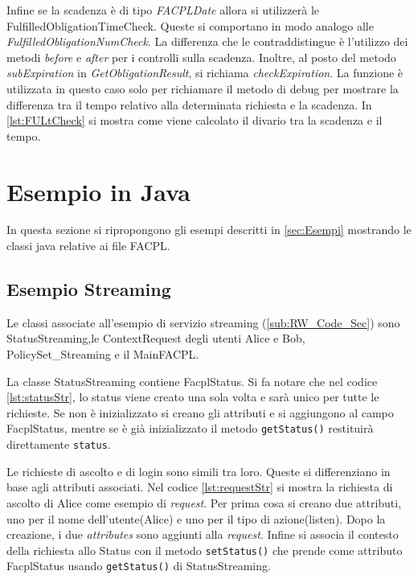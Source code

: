 Infine se la scadenza è di tipo \emph{FACPLDate} allora si utilizzerà le FulfilledObligationTimeCheck.
Queste si comportano in modo analogo alle \emph{FulfilledObligationNumCheck}. La differenza che le contraddistingue è
l'utilizzo dei metodi \emph{before} e \emph{after} per i controlli sulla scadenza.
Inoltre, al posto del metodo \emph{subExpiration} in \emph{GetObligationResult}, si richiama \emph{checkExpiration}.
La funzione è utilizzata in questo caso solo per richiamare il metodo di debug per mostrare
la differenza tra il tempo relativo alla determinata richiesta e la scadenza. In \ref{lst:FULtCheck} si
mostra come viene calcolato il divario tra la scadenza e il tempo.

\section{Esempio in Java}
\label{sec:Esempi in Java}
In questa sezione si ripropongono gli esempi descritti in \ref{sec:Esempi} mostrando le classi java relative
ai file FACPL.
\subsection{Esempio Streaming}
\label{sub:EsStreamingJava}
Le classi associate all'esempio di servizio streaming (\ref{sub:RW_Code_Sec})
sono StatusStreaming,le ContextRequest degli utenti Alice e Bob, PolicySet\_Streaming e il MainFACPL.

La classe StatusStreaming contiene FacplStatus. Si fa notare che nel codice \ref{lst:statusStr},
lo status viene creato una sola volta e sarà unico per tutte le richieste. Se non è inizializzato
si creano gli attributi e si aggiungono al campo FacplStatus, mentre se è già inizializzato il metodo
\texttt{getStatus()} restituirà direttamente \texttt{status}.

Le richieste di ascolto e di login sono simili tra loro. Queste si differenziano in base agli attributi associati.
Nel codice \ref{lst:requestStr} si mostra la richiesta di ascolto di Alice come esempio di \emph{request}.
Per prima cosa si creano due attributi, uno per il nome dell'utente(Alice) e uno per il tipo di azione(listen).
Dopo la creazione, i due \emph{attributes} sono aggiunti alla \emph{request}. Infine si associa il contesto della
richiesta allo Status con il metodo \texttt{setStatus()} che prende come attributo FacplStatus usando \texttt{getStatus()}
di StatusStreaming. \par
{}

